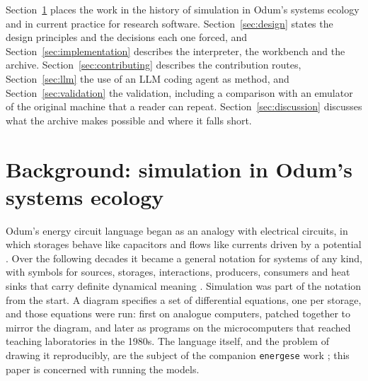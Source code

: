 Section~\ref{sec:background} places the work in the history of simulation in Odum's systems ecology and in current practice for research software. Section~\ref{sec:design} states the design principles and the decisions each one forced, and Section~\ref{sec:implementation} describes the interpreter, the workbench and the archive. Section~\ref{sec:contributing} describes the contribution routes, Section~\ref{sec:llm} the use of an LLM coding agent as method, and Section~\ref{sec:validation} the validation, including a comparison with an emulator of the original machine that a reader can repeat. Section~\ref{sec:discussion} discusses what the archive makes possible and where it falls short.

\section{Background: simulation in Odum's systems ecology}
\label{sec:background}

Odum's energy circuit language began as an analogy with electrical circuits, in which storages behave like capacitors and flows like currents driven by a potential \citep{odum1960}. Over the following decades it became a general notation for systems of any kind, with symbols for sources, storages, interactions, producers, consumers and heat sinks that carry definite dynamical meaning \citep{odum1972,odum1983,odum1994}. Simulation was part of the notation from the start. A diagram specifies a set of differential equations, one per storage, and those equations were run: first on analogue computers, patched together to mirror the diagram, and later as programs on the microcomputers that reached teaching laboratories in the 1980s. The language itself, and the problem of drawing it reproducibly, are the subject of the companion \texttt{energese} work \citep{energese}; this paper is concerned with running the models.

